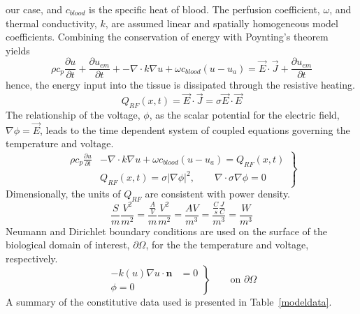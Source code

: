 \documentclass{article}
\newcommand{\picdir}{pdffig}
\begin{document}
our case, and  $c_{blood}$ is the specific heat of blood. 
The perfusion coefficient, $\omega$, and thermal conductivity, $k$,
are assumed linear and
spatially homogeneous model coefficients. 
Combining the conservation of energy with Poynting's 
theorem~\cite{jackson1999cer} yields
\[
 \rho  c_p \frac{\partial u}{\partial t} + 
           \frac{\partial u_{em}}{\partial t} + 
  -\nabla  \cdot k \nabla u + \omega c_{blood} (u - u_a )
 = \vec{E} \cdot \vec{J} + \frac{\partial u_{em}}{\partial t} 
\]
hence, the energy input into the tissue is
dissipated through the resistive heating.
\[
Q_{RF}(x,t) = \vec{E} \cdot \vec{J} 
            = \sigma \vec{E} \cdot \vec{E} 
\]
The relationship of the voltage, $\phi$, as the scalar potential for the
electric field, $\nabla \phi = \vec{E}$, leads to the time dependent system
of coupled equations governing the temperature and voltage.
\begin{equation} \label{bioheatmodel}
\left.
\begin{split}
 \rho  c_p \frac{\partial u}{\partial t}
 & -\nabla  \cdot k \nabla u + \omega c_{blood} (u - u_a )
 = Q_{RF}(x,t) \\
 & Q_{RF}(x,t) = \sigma |\nabla \phi|^2, \qquad 
        \nabla \cdot \sigma \nabla \phi = 0
\end{split}
\right\}
\end{equation}
Dimensionally, the units of $Q_{RF}$ are consistent with power density.
\[
\frac{S}{m} \frac{V^2}{m^2} 
  = \frac{\frac{A}{V}}{m} \frac{V^2}{m^2}  
  = \frac{A V}{m^3} 
  = \frac{ \frac{C}{s} \frac{J}{C} }{m^3} 
  = \frac{W}{m^3} 
\]
Neumann and Dirichlet boundary conditions are used on the surface of
the biological domain of interest, $\partial \Omega$, for the 
the temperature and voltage, respectively. 
\[
\left.
\begin{split}
 - k(u)      \nabla   u  \cdot \textbf{n}  & = 0 
\\
  \phi = 0
\end{split} 
\right\}
\qquad \text{on } \partial \Omega
\]
A summary of the 
constitutive data used is presented in Table~\ref{modeldata}.
\end{document}
